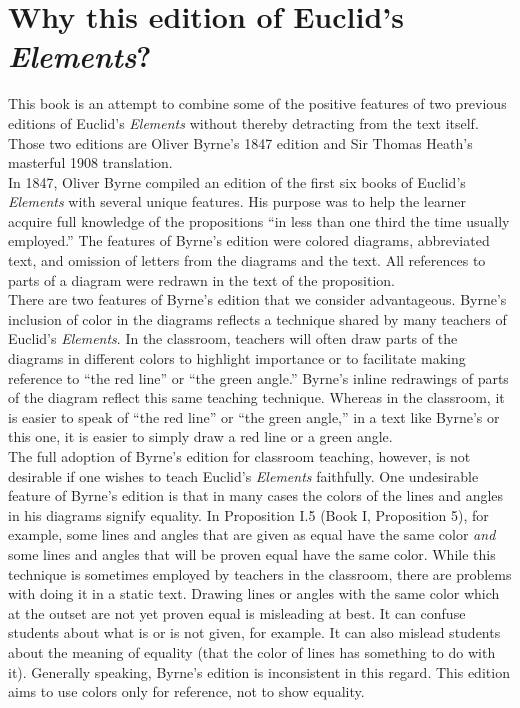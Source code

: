 \documentclass[12pt, twoside]{memoir}
\begin{document}
\section*{Why this edition of Euclid's \textit{Elements}?}

This book is an attempt to combine some of the positive features of two previous editions of Euclid's \textit{Elements} without thereby detracting from the text itself. Those two editions are Oliver Byrne's 1847 edition and Sir Thomas Heath's masterful 1908 translation. \\

In 1847, Oliver Byrne compiled an edition of the first six books of Euclid's \textit{Elements} with several unique features. His purpose was to help the learner acquire full knowledge of the propositions ``in less than one third the time usually employed.'' The features of Byrne's edition were colored diagrams, abbreviated text, and omission of letters from the diagrams and the text. All references to parts of a diagram were redrawn in the text of the proposition. \\

There are two features of Byrne's edition that we consider advantageous. Byrne's inclusion of color in the diagrams reflects a technique shared by many teachers of Euclid's \textit{Elements}. In the classroom, teachers will often draw parts of the diagrams in different colors to highlight importance or to facilitate making reference to ``the red line'' or ``the green angle.'' Byrne's inline redrawings of parts of the diagram reflect this same teaching technique. Whereas in the classroom, it is easier to speak of ``the red line'' or ``the green angle,'' in a text like Byrne's or this one, it is easier to simply draw a red line or a green angle. \\

The full adoption of Byrne's edition for classroom teaching, however, is not desirable if one wishes to teach Euclid's \textit{Elements} faithfully. One undesirable feature of Byrne's edition is that in many cases the colors of the lines and angles in his diagrams signify equality. In Proposition I.5 (Book I, Proposition 5), for example, some lines and angles that are given as equal have the same color \textit{and} some lines and angles that will be proven equal have the same color. While this technique is sometimes employed by teachers in the classroom, there are problems with doing it in a static text. Drawing lines or angles with the same color which at the outset are not yet proven equal is misleading at best. It can confuse students about what is or is not given, for example. It can also mislead students about the meaning of equality (that the color of lines has something to do with it). Generally speaking, Byrne's edition is inconsistent in this regard. This edition aims to use colors only for reference, not to show equality.\\
\end{document}
